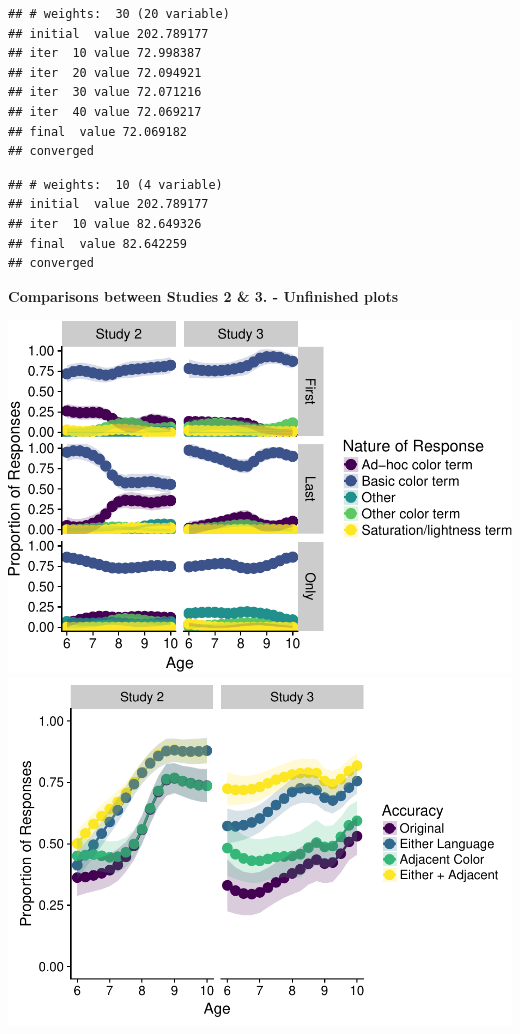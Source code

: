 \documentclass[man]{apa6}
\theoremstyle{definition}
\theoremstyle{definition}
\theoremstyle{definition}
\theoremstyle{remark}
\begin{document}
\begin{verbatim}
## # weights:  30 (20 variable)
## initial  value 202.789177 
## iter  10 value 72.998387
## iter  20 value 72.094921
## iter  30 value 72.071216
## iter  40 value 72.069217
## final  value 72.069182 
## converged
\end{verbatim}

\begin{verbatim}
## # weights:  10 (4 variable)
## initial  value 202.789177 
## iter  10 value 82.649326
## final  value 82.642259 
## converged
\end{verbatim}

\textbf{Comparisons between Studies 2 \& 3. - Unfinished plots}

\includegraphics{amazon_color_files/figure-latex/crossstudy_accuracystrats-1.pdf}
\includegraphics{amazon_color_files/figure-latex/crossstudy_accuracystrats-2.pdf}
\end{document}
